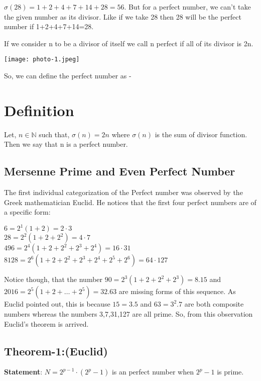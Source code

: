 \documentclass[12pt,,a4paper]{book}
\begin{document}
$\sigma(28) = 1 + 2 + 4 + 7 + 14 + 28 = 56$. But for a perfect number, we can't take the given number as its divisor. Like if we take 28 then 28 will be the perfect number if 1+2+4+7+14=28.\\
\par
If we consider n to be a divisor of itself we call n perfect if all of its divisor is 2n. 
\begin{center}
    \texttt{[image: photo-1.jpeg]}
\end{center}


\bigskip
So, we can define the perfect number as -

\section{Definition}
Let, $n \in \mathbb{N}$
 such that,  $\sigma(n) = 2n$  where  $\sigma(n)$ is the sum of divisor function. Then we say that n is a perfect number.
\subsection{Mersenne Prime and Even Perfect Number}
The first individual categorization of the Perfect number was observed by the Greek mathematician Euclid. \newline
He notices that the first four perfect numbers are of a specific form: \newline

 $6 = 2^1(1+2) = 2 \cdot 3$ \\
 $28 = 2^2(1+2+2^2) = 4 \cdot 7$ \\
$496 = 2^4(1+2+2^2+2^3+2^4) = 16 \cdot 31$ \\
$8128 = 2^6(1+2+2^2+2^3+2^4+2^5+2^6) = 64 \cdot 127$

Notice though, that the number 
$90 = 2^3(1 + 2 + 2^2 + 2^3) = 8.15$
 and 
$2016 = 2^5(1 + 2 + \ldots + 2^5) = 32.63$
 are missing forms of this sequence. As Euclid pointed out, this is because 
$15 = 3.5$      and     $63 = 3^{2}.7$
 are both composite numbers whereas the numbers 3,7,31,127 are all prime. So, from this observation Euclid's theorem is arrived.




\subsection{Theorem-1:(Euclid)}
\textbf{Statement}:  \(N = 2^{p-1} \cdot (2^p-1)\) is an  perfect number when \(2^{p}-1\) is prime.
\end{document}
